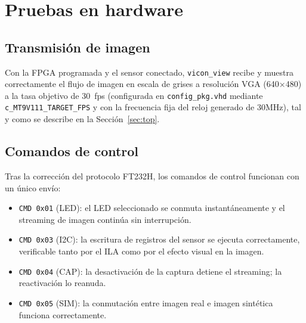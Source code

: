 \documentclass[../main.tex]{subfiles}
\begin{document}
\section{Pruebas en hardware}

\subsection{Transmisión de imagen}

Con la FPGA programada y el sensor conectado, \texttt{vicon\_view} recibe y muestra correctamente el flujo de imagen en escala de grises a resolución VGA (640$\times$480) a la tasa objetivo de 30~fps (configurada en \texttt{config\_pkg.vhd} mediante \texttt{c\_MT9V111\_TARGET\_FPS} y con la frecuencia fija del reloj generado de 30MHz), tal y como se describe en la Sección~\ref{sec:top}.

\subsection{Comandos de control}

Tras la corrección del protocolo FT232H, los comandos de control funcionan con un único envío:

\begin{itemize}
    \item \texttt{CMD 0x01} (LED): el LED seleccionado se conmuta instantáneamente y el streaming de imagen continúa sin interrupción.
    \item \texttt{CMD 0x03} (I2C): la escritura de registros del sensor se ejecuta correctamente, verificable tanto por el ILA como por el efecto visual en la imagen.
    \item \texttt{CMD 0x04} (CAP): la desactivación de la captura detiene el streaming; la reactivación lo reanuda.
    \item \texttt{CMD 0x05} (SIM): la conmutación entre imagen real e imagen sintética funciona correctamente.
\end{itemize}
\end{document}
